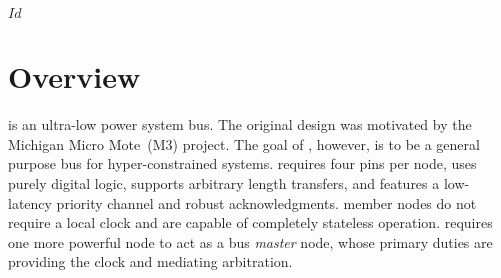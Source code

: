 \svnInfo $Id$

\section*{Overview}
\bus is an ultra-low power system bus. The original design was motivated by
the Michigan Micro Mote~(M3) project. The goal of \bus, however, is to be a
general purpose bus for hyper-constrained systems. \bus requires four pins per
node, uses purely digital logic, supports arbitrary length transfers, and
features a low-latency priority channel and robust acknowledgments. \bus
member nodes do not require a local clock and are capable of completely
stateless operation. \bus requires one more powerful node to act as a bus {\em
master} node, whose primary duties are providing the \bus clock and mediating
arbitration.
